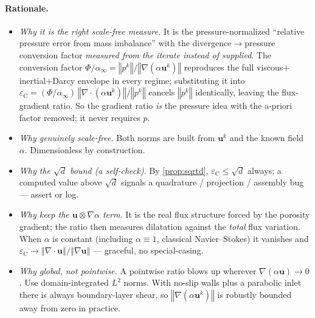 \documentclass[11pt]{article}
\newcommand{\bu}{\boldsymbol{u}}
\newcommand{\grad}{\nabla}
\newcommand{\divg}{\nabla\!\cdot\!}
\newcommand{\norm}[1]{\left\Vert #1\right\Vert}
\newcommand{\epsC}{\varepsilon_{\mathrm C}}
\theoremstyle{plain}
\theoremstyle{remark}
\begin{document}
\paragraph{Rationale.}
\begin{itemize}
  \item \emph{Why it is the right scale-free measure.} It is the
    pressure-normalized ``relative pressure error from mass imbalance'' with the
    divergence$\to$pressure conversion factor \emph{measured from the iterate
    instead of supplied}. The conversion factor
    $\Phi/\alpha_\infty=\norm{p^k}/\norm{\grad(\alpha\bu^k)}$ reproduces the full
    viscous$+$inertial$+$Darcy envelope in every regime; substituting it into
    $\epsC=(\Phi/\alpha_\infty)\,\norm{\divg(\alpha\bu^k)}/\norm{p^k}$ cancels
    $\norm{p^k}$ identically, leaving the flux-gradient ratio. So the gradient
    ratio \emph{is} the pressure idea with the a-priori factor removed; it never
    requires $p$.
  \item \emph{Why genuinely scale-free.} Both norms are built from $\bu^k$ and the
    known field $\alpha$. Dimensionless by construction.
  \item \emph{Why the $\sqrt{d}$ bound (a self-check).} By
    \cref{prop:sqrtd}, $\epsC\le\sqrt{d}$ always; a computed value above
    $\sqrt{d}$ signals a quadrature / projection / assembly bug --- assert or log.
  \item \emph{Why keep the $\bu\otimes\grad\alpha$ term.} It is the real flux
    structure forced by the porosity gradient; the ratio then measures dilatation
    against the \emph{total} flux variation. When $\alpha$ is constant (including
    $\alpha\equiv1$, classical Navier--Stokes) it vanishes and
    $\epsC\to\norm{\divg\bu}/\norm{\grad\bu}$ --- graceful, no special-casing.
  \item \emph{Why global, not pointwise.} A pointwise ratio blows up wherever
    $\grad(\alpha\bu)\to0$. Use domain-integrated $L^2$ norms. With no-slip walls
    plus a parabolic inlet there is always boundary-layer shear, so
    $\norm{\grad(\alpha\bu^k)}$ is robustly bounded away from zero in practice.
\end{itemize}

\end{document}
